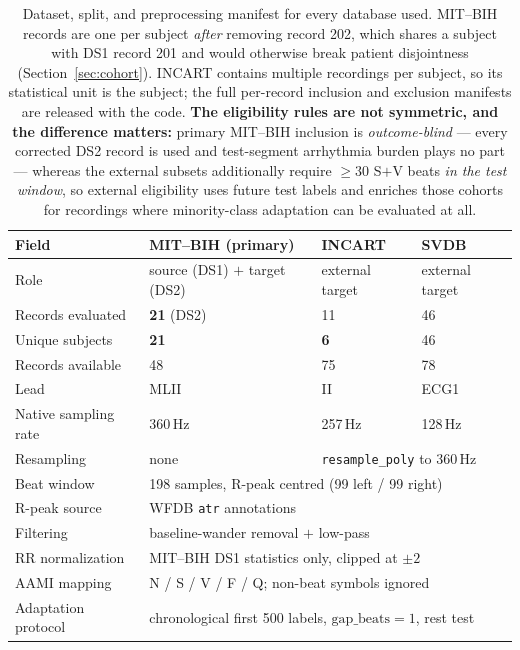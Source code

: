 \begin{table}[H]
\centering
\small
\caption{Dataset, split, and preprocessing manifest for every database used.
MIT--BIH records are one per subject \emph{after} removing record 202, which
shares a subject with DS1 record 201 and would otherwise break patient
disjointness (Section~\ref{sec:cohort}). INCART contains multiple recordings per
subject, so its statistical unit is the subject; the full per-record inclusion
and exclusion manifests are released with the code.
\textbf{The eligibility rules are not symmetric, and the difference matters:}
primary MIT--BIH inclusion is \emph{outcome-blind} --- every corrected DS2
record is used and test-segment arrhythmia burden plays no part --- whereas the
external subsets additionally require $\ge 30$ S$+$V beats \emph{in the test
window}, so external eligibility uses future test labels and enriches those
cohorts for recordings where minority-class adaptation can be evaluated at
all.}
\label{tab:dataset_manifest}
\setlength{\tabcolsep}{5pt}
\begin{tabular}{llll}
\toprule
Field & MIT--BIH (primary) & INCART & SVDB \\
\midrule
Role & source (DS1) $+$ target (DS2) & external target & external target \\
Records evaluated & \textbf{21} (DS2) & 11 & 46 \\
Unique subjects & \textbf{21} & \textbf{6} & 46 \\
Records available & 48 & 75 & 78 \\
Lead & MLII & II & ECG1 \\
Native sampling rate & 360\,Hz & 257\,Hz & 128\,Hz \\
Resampling & none & \multicolumn{2}{l}{\texttt{resample\_poly} to 360\,Hz} \\
Beat window & \multicolumn{3}{l}{198 samples, R-peak centred (99 left / 99 right)} \\
R-peak source & \multicolumn{3}{l}{WFDB \texttt{atr} annotations} \\
Filtering & \multicolumn{3}{l}{baseline-wander removal $+$ low-pass} \\
RR normalization & \multicolumn{3}{l}{MIT--BIH DS1 statistics only, clipped at $\pm2$} \\
AAMI mapping & \multicolumn{3}{l}{N / S / V / F / Q; non-beat symbols ignored} \\
Adaptation protocol & \multicolumn{3}{l}{chronological first 500 labels, $\mathrm{gap\_beats}=1$, rest test} \\

\end{tabular}
\end{table}
